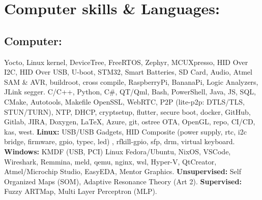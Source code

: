 \documentclass[article]{moderncv}
\begin{document}
\section{Computer skills \& Languages:}
\subsection{Computer:}
%
{Yocto, Linux kernel, DeviceTree, FreeRTOS, Zephyr, MCUXpresso, HID Over I2C, HID Over USB, U-boot, STM32, Smart Batteries, SD Card, Audio, Atmel SAM \& AVR, buildroot, cross compile, RaspberryPi, BananaPi, Logic Analyzers, JLink segger.}{}{}{}
%
{C/C++, Python, C\#, QT/Qml, Bash, PowerShell, Java, JS, SQL, CMake, Autotools, Makefile}{}{}{}
%
{OpenSSL, WebRTC, P2P (lite-p2p: DTLS/TLS, STUN/TURN), NTP, DHCP, cryptsetup, flutter, secure boot, docker, GitHub, Gitlab, JIRA, Doxygen, \LaTeX, Azure, git, ostree OTA, OpenGL, repo, CI/CD, kas, west.}{}{}{}
%
{\textbf{Linux:} USB/USB Gadgets, HID Composite (power supply, rtc, i2c bridge, firmware, gpio, typec, led) , rfkill-gpio, sfp, drm, virtual keyboard. 
\textbf{Windows:} KMDF (USB, PCI)}{}{}{}
%
{Linux Fedora/Ubuntu, NixOS, VSCode, Wireshark, Remmina, meld, qemu, nginx, wsl, Hyper-V, QtCreator, Atmel/Microchip Studio, EasyEDA, Mentor Graphics.}{}{}{}
%
{\textbf{Unsupervised:} Self Organized Maps (SOM), Adaptive Resonance Theory (Art 2).  \textbf{Supervised:} Fuzzy ARTMap, Multi Layer Perceptron (MLP).}{}{}{}
\end{document}
